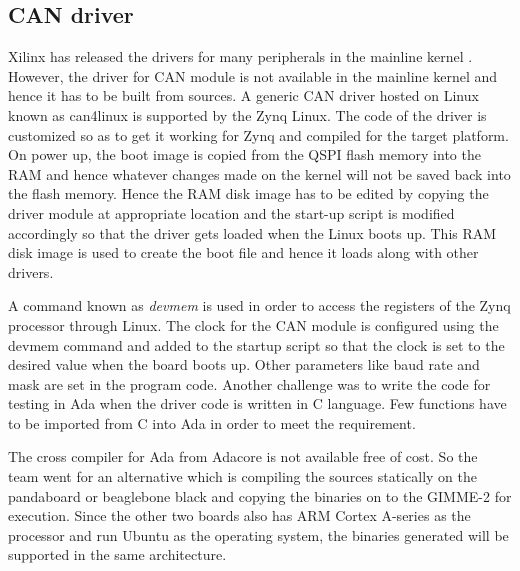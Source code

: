 \subsection{CAN driver}
Xilinx has released the drivers for many peripherals in the mainline kernel \cite{XilDrivers}. However, the driver for CAN module is not available in the mainline kernel and hence it has to be built from sources. A generic CAN driver hosted on Linux known as can4linux \cite{can4linux} is supported by the Zynq Linux. The code of the driver is customized so as to get it working for Zynq and compiled for the target platform. On power up, the boot image is copied from the QSPI flash memory into the RAM and hence whatever changes made on the kernel will not be saved back into the flash memory. Hence the RAM disk image has to be edited by copying the driver module at appropriate location and the start-up script is modified accordingly so that the driver gets loaded when the Linux boots up. This RAM disk image is used to create the boot file and hence it loads along with other drivers. 

A command known as \textit{devmem} is used in order to access the registers of the Zynq processor through Linux. The clock for the CAN module is configured using the devmem command and added to the startup script so that the clock is set to the desired value when the board boots up. Other parameters like baud rate and mask are set in the program code. Another challenge was to write the code for testing in Ada when the driver code is written in C language. Few functions have to be imported from C into Ada in order to meet the requirement.

The cross compiler for Ada from Adacore is not available free of cost. So the team went for an alternative which is compiling the sources statically on the pandaboard or beaglebone black and copying the binaries on to the GIMME-2 for execution. Since the other two boards also has ARM Cortex A-series as the processor and run Ubuntu as the operating system, the binaries generated will be supported in the same architecture. 

%
